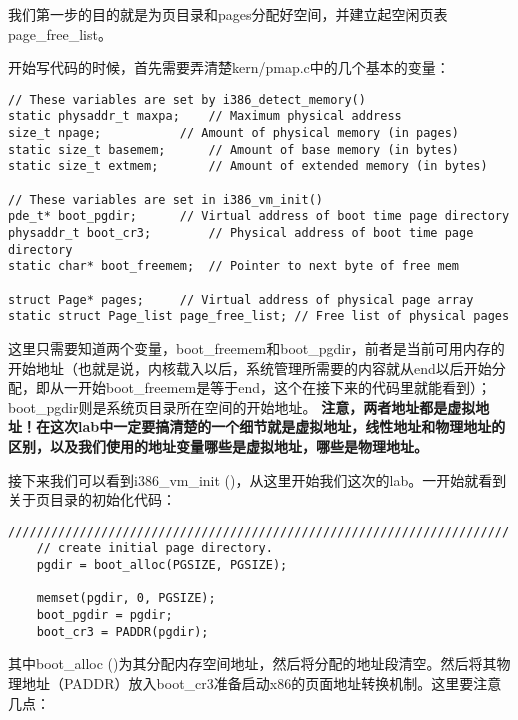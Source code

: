 \documentclass{article}
\newcommand{\highlight}[1]{{\bfseries \color{red}  #1}}
\newcommand{\funcname}[1]{{\ttfamily \small #1}}
\begin{document}
\begin{CJK*}{UTF8}{gkai}
我们第一步的目的就是为页目录和pages分配好空间，并建立起空闲页表page\_free\_list。


开始写代码的时候，首先需要弄清楚kern/pmap.c中的几个基本的变量：

\begin{lstlisting}[style=ccode, firstnumber=12, title={\scriptsize \ttfamily \bfseries kern/pmap.c}]
// These variables are set by i386_detect_memory()
static physaddr_t maxpa;	// Maximum physical address
size_t npage;			// Amount of physical memory (in pages)
static size_t basemem;		// Amount of base memory (in bytes)
static size_t extmem;		// Amount of extended memory (in bytes)

// These variables are set in i386_vm_init()
pde_t* boot_pgdir;		// Virtual address of boot time page directory
physaddr_t boot_cr3;		// Physical address of boot time page directory
static char* boot_freemem;	// Pointer to next byte of free mem

struct Page* pages;		// Virtual address of physical page array
static struct Page_list page_free_list;	// Free list of physical pages
\end{lstlisting}

这里只需要知道两个变量，boot\_freemem和boot\_pgdir，前者是当前可用内存的开始地址（也就是说，内核载入以后，系统管理所需要的内容就从end以后开始分配，即从一开始boot\_freemem是等于end，这个在接下来的代码里就能看到）；boot\_pgdir则是系统页目录所在空间的开始地址。\highlight{注意，两者地址都是虚拟地址！在这次lab中一定要搞清楚的一个细节就是虚拟地址，线性地址和物理地址的区别，以及我们使用的地址变量哪些是虚拟地址，哪些是物理地址。}


接下来我们可以看到\funcname{i386\_vm\_init ()}，从这里开始我们这次的lab。一开始就看到关于页目录的初始化代码：

\begin{lstlisting}[style=ccode, title={\scriptsize \ttfamily \bfseries kern/pmap.c: i386\_vm\_init ()}]
	//////////////////////////////////////////////////////////////////////
	// create initial page directory.
	pgdir = boot_alloc(PGSIZE, PGSIZE);

	memset(pgdir, 0, PGSIZE);
	boot_pgdir = pgdir;
	boot_cr3 = PADDR(pgdir);
\end{lstlisting}

其中\funcname{boot\_alloc ()}为其分配内存空间地址，然后将分配的地址段清空。然后将其物理地址（PADDR）放入boot\_cr3准备启动x86的页面地址转换机制。这里要注意几点：


\end{CJK*}
\end{document}
